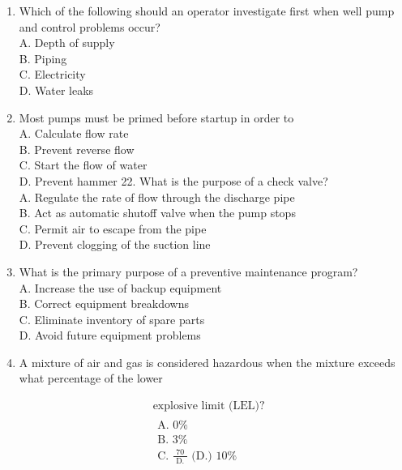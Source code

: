 \documentclass[10pt]{article}
\begin{document}
\begin{enumerate}
  \item Which of the following should an operator investigate first when well pump and control problems occur?\\
A. Depth of supply\\
B. Piping\\
C. Electricity\\
D. Water leaks

  \item Most pumps must be primed before startup in order to\\
A. Calculate flow rate\\
B. Prevent reverse flow\\
C. Start the flow of water\\
D. Prevent hammer 22. What is the purpose of a check valve?\\
A. Regulate the rate of flow through the discharge pipe\\
B. Act as automatic shutoff valve when the pump stops\\
C. Permit air to escape from the pipe\\
D. Prevent clogging of the suction line

  \item What is the primary purpose of a preventive maintenance program?\\
A. Increase the use of backup equipment\\
B. Correct equipment breakdowns\\
C. Eliminate inventory of spare parts\\
D. Avoid future equipment problems

  \item A mixture of air and gas is considered hazardous when the mixture exceeds what percentage of the lower

\end{enumerate}

$$
\begin{aligned}
&\text { explosive limit (LEL)? } \\
&\begin{array}{ll}
\text { A. } 0 \% & \\
\text { B. } 3 \% \\
\text { C. } \frac{70}{\text { D. }} \text { (D.) } 10 \%
\end{array}
\end{aligned}
$$
\end{document}
